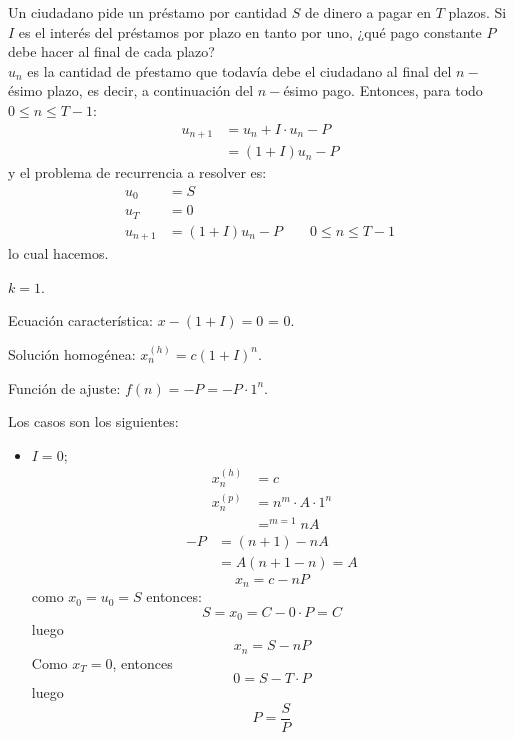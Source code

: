 \begin{ejercicio}
    Un ciudadano pide un préstamo por cantidad $S$ de dinero a pagar en $T$ plazos. Si $I$ es el interés del préstamos por plazo en tanto por uno, ¿qué pago constante $P$ debe hacer al final de cada plazo?\\

   $u_n$ es la cantidad de pŕestamo que todavía debe el ciudadano al final del $n-$ésimo plazo, es decir, a continuación del $n-$ésimo pago. 
   Entonces, para todo $0 \leq n \leq T-1$:
    \begin{align*}
        u_{n+1} &= u_n + I \cdot u_n - P \\
                &= (1+I) u_n - P
    \end{align*}
    y el problema de recurrencia a resolver es:
    \begin{align*}
        u_0 &= S \\
        u_T &= 0 \\
        u_{n+1} &= (1+I)u_n - P \qquad 0 \leq n \leq T - 1
    \end{align*}
    lo cual hacemos.
    \begin{description}
        \item $k = 1$.
        \item Ecuación característica: $x-(1+I) = 0$ = 0.
        \item Solución homogénea: $x_n^{(h)} = c{(1+I)}^n$.
        \item Función de ajuste: $f(n) = -P = -P\cdot 1^n$.
    \end{description}
    Los casos son los siguientes:
    \begin{itemize}
        \item $I = 0$;
        \begin{align*}
            x_n^{(h)} &= c \\
            x_n^{(p)} &= n^m \cdot A \cdot 1^n \\
                      &\mathop{=}^{m=1} nA
        \end{align*}
        \begin{align*}
            -P &= (n+1) -nA \\
               &= A(n+1-n) = A
        \end{align*}
        \begin{equation*}
            x_n = c - nP
        \end{equation*}
        como $x_0 = u_0 = S$ entonces:
        \begin{equation*}
            S = x_0 = C - 0\cdot P = C
        \end{equation*}
        luego
        \begin{equation*}
            x_n = S - nP
        \end{equation*}
        Como $x_T = 0$, entonces 
        \begin{equation*}
            0 = S - T\cdot P
        \end{equation*}
        luego
        \begin{equation*}
            P = \dfrac{S}{P}
        \end{equation*}


\end{itemize}
\end{ejercicio}
